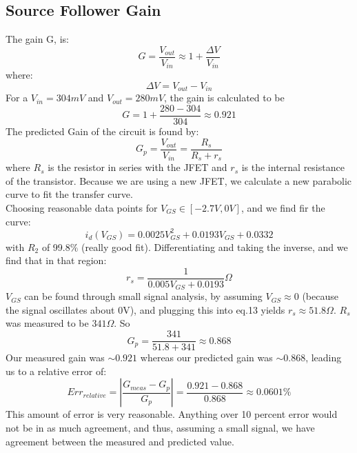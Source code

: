 \documentclass{article}
\begin{document}
\subsection{Source Follower Gain}
    The gain G, is:
    \begin{equation}
        G = \frac{V_{out}}{V_{in}} \approx 1 + \frac{\Delta V}{V_{in}}
    \end{equation}
    where:
    \begin{equation}
        \Delta V = V_{out} - V_{in}
    \end{equation}
    For a $V_{in} = 304 mV$ and $V_{out} = 280 mV$, the gain is calculated to be 
    \begin{equation}
        G = 1 + \frac{280 - 304}{304} \approx 0.921
    \end{equation}
    The predicted Gain of the circuit is found by:
    \begin{equation}
        G_p = \frac{V_{out}}{V_{in}} = \frac{R_s}{R_s + r_s}
    \end{equation}
    where $R_s$ is the resistor in series with the JFET and $r_s$ is the internal resistance of the transistor. Because we are using a new JFET, we calculate a new parabolic curve to fit the transfer curve.\\\indent
    Choosing reasonable data points for $V_{GS}\in[-2.7V,0V]$, and we find fir the curve:
    \begin{equation}
        i_d(V_{GS}) = 0.0025V_{GS}^{2} + 0.0193V_{GS} + 0.0332
    \end{equation}
    with $R_{2}$ of 99.8$\%$ (really good fit). Differentiating and taking the inverse, and we find that in that region:
    \begin{equation}
        r_s = \frac{1}{0.005 V_{GS} + 0.0193} \Omega
    \end{equation}
    $V_{GS}$ can be found through small signal analysis, by assuming $V_{GS} \approx 0$ (because the signal oscillates about 0V), and plugging this into eq.13 yields $r_s \approx 51.8 \Omega$. $R_s$ was measured to be $341 \Omega$. So
    \begin{equation}
        G_p = \frac{341}{51.8 + 341} \approx 0.868
    \end{equation}
    Our measured gain was $\sim 0.921$ whereas our predicted gain was $\sim 0.868$, leading us to a relative error of:
    \begin{equation}
        Err_{relative} = |\frac{G_{meas} - G_p}{G_p}| = \frac{0.921 - 0.868}{0.868} \approx 0.0601\%
    \end{equation}
    This amount of error is very reasonable. Anything over 10 percent error would not be in as much agreement, and thus, assuming a small signal, we have agreement between the measured and predicted value.
    
\end{document}
